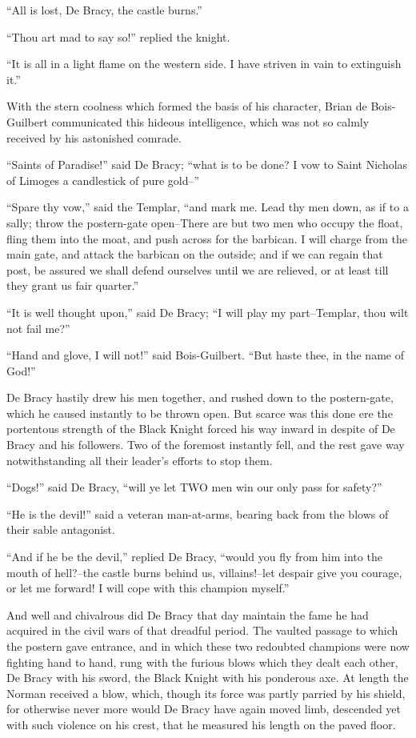 ``All is lost, De Bracy, the castle burns.''

``Thou art mad to say so!'' replied the knight.

``It is all in a light flame on the western side. I have striven in vain
to extinguish it.''

With the stern coolness which formed the basis of his character, Brian
de Bois-Guilbert communicated this hideous intelligence, which was not
so calmly received by his astonished comrade.

``Saints of Paradise!'' said De Bracy; ``what is to be done? I vow to
Saint Nicholas of Limoges a candlestick of pure gold--''

``Spare thy vow,'' said the Templar, ``and mark me. Lead thy men down,
as if to a sally; throw the postern-gate open--There are but two men who
occupy the float, fling them into the moat, and push across for the
barbican. I will charge from the main gate, and attack the barbican on
the outside; and if we can regain that post, be assured we shall defend
ourselves until we are relieved, or at least till they grant us fair
quarter.''

``It is well thought upon,'' said De Bracy; ``I will play my
part--Templar, thou wilt not fail me?''

``Hand and glove, I will not!'' said Bois-Guilbert. ``But haste thee, in
the name of God!''

De Bracy hastily drew his men together, and rushed down to the
postern-gate, which he caused instantly to be thrown open. But scarce
was this done ere the portentous strength of the Black Knight forced his
way inward in despite of De Bracy and his followers. Two of the foremost
instantly fell, and the rest gave way notwithstanding all their leader's
efforts to stop them.

``Dogs!'' said De Bracy, ``will ye let TWO men win our only pass for
safety?''

``He is the devil!'' said a veteran man-at-arms, bearing back from the
blows of their sable antagonist.

``And if he be the devil,'' replied De Bracy, ``would you fly from him
into the mouth of hell?--the castle burns behind us, villains!--let
despair give you courage, or let me forward! I will cope with this
champion myself.''

And well and chivalrous did De Bracy that day maintain the fame he had
acquired in the civil wars of that dreadful period. The vaulted passage
to which the postern gave entrance, and in which these two redoubted
champions were now fighting hand to hand, rung with the furious blows
which they dealt each other, De Bracy with his sword, the Black Knight
with his ponderous axe. At length the Norman received a blow, which,
though its force was partly parried by his shield, for otherwise never
more would De Bracy have again moved limb, descended yet with such
violence on his crest, that he measured his length on the paved floor.

